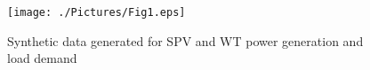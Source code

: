 \documentclass[journal]{IEEEtran}
\begin{document}
\begin{figure}
	\centering
	\texttt{[image: ./Pictures/Fig1.eps]}
	\caption{ Synthetic data generated for SPV and WT power generation and load demand}
	\label{Fig:Fig1}
\end{figure}
\end{document}

